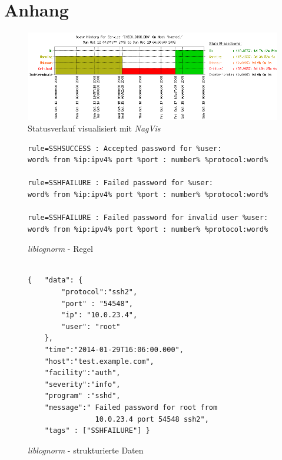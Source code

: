 \chapter*{Anhang}\label{appendix}
\setcounter{chapter}{5}
\thispagestyle{fancy}
\vspace{1cm}
\begin{figure}[htbp]
    \caption{Statusverlauf visualisiert mit \textit{NagVis}}
    \label{app:nag}\vspace{0.2cm}
    \centering
    \includegraphics[scale=0.6]{img/nag_trend}  
\end{figure}

\vspace{4cm}
\begin{figure}[h]
    \caption{\textit{liblognorm} - Regel}
    \label{app:liblognorm-rule}\vspace{0.2cm}
    \centering
\begin{minipage}{0.8\textwidth}
\begin{verbatim}
rule=SSHSUCCESS : Accepted password for %user:
word% from %ip:ipv4% port %port : number% %protocol:word%

rule=SSHFAILURE : Failed password for %user:
word% from %ip:ipv4% port %port : number% %protocol:word%

rule=SSHFAILURE : Failed password for invalid user %user:
word% from %ip:ipv4% port %port : number% %protocol:word%

\end{verbatim}
\end{minipage}
\end{figure}


\begin{figure}[h]
    \caption{\textit{liblognorm} - strukturierte Daten}
    \label{app:liblognorm-normalisation}\vspace{0.2cm}
    \centering
    \begin{minipage}{0.8\textwidth}
\begin{verbatim}
        
{   "data": {
        "protocol":"ssh2",
        "port" : "54548",
        "ip": "10.0.23.4",
        "user": "root"
    },
    "time":"2014-01-29T16:06:00.000",
    "host":"test.example.com",
    "facility":"auth",
    "severity":"info",
    "program" :"sshd",
    "message":" Failed password for root from
                10.0.23.4 port 54548 ssh2",
    "tags" : ["SSHFAILURE"] }
\end{verbatim}
\end{minipage}
\end{figure}



